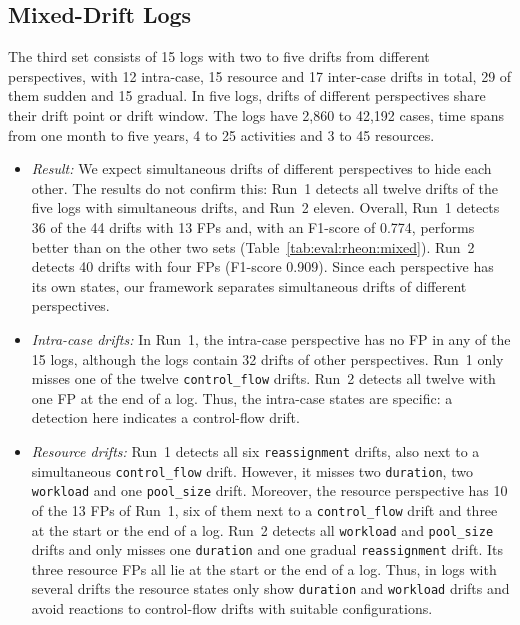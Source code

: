 \subsection{Mixed-Drift Logs}
\label{sec:eval:rheon:mixed}
The third set consists of 15 logs with two to five drifts from different perspectives, with 12 intra-case, 15 resource and 17 inter-case drifts in total, 29 of them sudden and 15 gradual. In five logs, drifts of different perspectives share their drift point or drift window. The logs have 2,860 to 42,192 cases, time spans from one month to five years, 4 to 25 activities and 3 to 45 resources.
\begin{itemize}
	\item \emph{Result:} We expect simultaneous drifts of different perspectives to hide each other. The results do not confirm this: Run~1 detects all twelve drifts of the five logs with simultaneous drifts, and Run~2 eleven. Overall, Run~1 detects 36 of the 44 drifts with 13 FPs and, with an F1-score of 0.774, performs better than on the other two sets (Table~\ref{tab:eval:rheon:mixed}). Run~2 detects 40 drifts with four FPs (F1-score 0.909). Since each perspective has its own states, our framework separates simultaneous drifts of different perspectives.
	\item \emph{Intra-case drifts:} \label{sec:eval:rheon:mixed:intra} In Run~1, the intra-case perspective has no FP in any of the 15 logs, although the logs contain 32 drifts of other perspectives. Run~1 only misses one of the twelve \texttt{control\_flow} drifts. Run~2 detects all twelve with one FP at the end of a log. Thus, the intra-case states are specific: a detection here indicates a control-flow drift.
	\item \emph{Resource drifts:} \label{sec:eval:rheon:mixed:resource} Run~1 detects all six \texttt{reassignment} drifts, also next to a simultaneous \texttt{control\_flow} drift. However, it misses two \texttt{duration}, two \texttt{workload} and one \texttt{pool\_size} drift. Moreover, the resource perspective has 10 of the 13 FPs of Run~1, six of them next to a \texttt{control\_flow} drift and three at the start or the end of a log. Run~2 detects all \texttt{workload} and \texttt{pool\_size} drifts and only misses one \texttt{duration} and one gradual \texttt{reassignment} drift. Its three resource FPs all lie at the start or the end of a log. Thus, in logs with several drifts the resource states only show \texttt{duration} and \texttt{workload} drifts and avoid reactions to control-flow drifts with suitable configurations.

\end{itemize}

